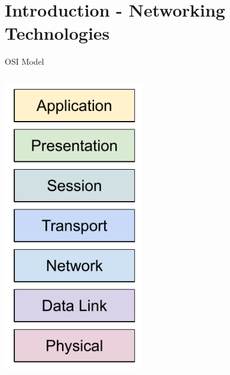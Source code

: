 \section{Introduction - Networking Technologies}

\begin{frame}{OSI Model}
	\begin{columns}
		\includegraphics[width=0.9\textwidth]{slides/networking-stack-overview/osi.pdf}

\end{columns}
\end{frame}
